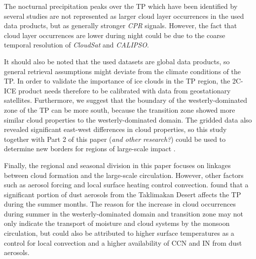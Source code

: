 \documentclass[alpha-refs]{wiley-article}
\begin{document}
The nocturnal precipitation peaks over the TP which have been identified by several studies \citep[Kukulies et. al, \textit{unpublished manuscript}]{m10, m11, m11_2, m12_2} are not represented as larger cloud layer occurrences in the used data products, but as generally stronger \textit{CPR} signals. However, the fact that cloud layer occurrences are lower during night could be due to the coarse temporal resolution of \textit{CloudSat} and \textit{CALIPSO}. 



It should also be noted that the used datasets are global data products, so general retrieval assumptions might deviate from the climate conditions of the TP. In order to validate the importance of ice clouds in the TP region, the 2C-ICE product needs therefore to be calibrated with data from geostationary satellites. Furthermore, we suggest that the boundary of the westerly-dominated zone of the TP can be more south, because the transition zone showed more similar cloud properties to the westerly-dominated domain. The gridded data also revealed significant east-west differences in cloud properties, so this study together with Part 2 of this paper (\textit{and other research?}) could be used to determine new borders for regions of large-scale impact \citep{cu13_2}. 


Finally, the regional and seasonal division in this paper focuses on linkages between cloud formation and the large-scale circulation. However, other factors such as aerosol forcing and local surface heating control convection. \citet{d2007summer} found that a significant portion of dust aerosols from the Taklimakan Desert affects the TP during the summer months. The reason for the increase in cloud occurrences during summer in the westerly-dominated domain and transition zone may not only indicate the transport of moisture and cloud systems by the monsoon circulation, but could also be attributed to higher surface temperatures as a control for local convection and a higher availability of CCN and IN from dust aerosols. 


\clearpage

\end{document}

